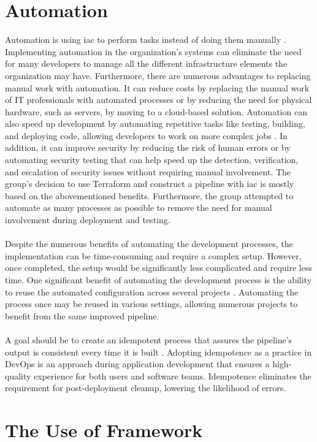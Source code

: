 \section{Automation}
Automation is using \gls{iac} to perform tasks instead of doing them manually \cite{automationredhat}. Implementing automation in the organization's systems can eliminate the need for many developers to manage all the different infrastructure elements the organization may have. Furthermore, there are numerous advantages to replacing manual work with automation. It can reduce costs by replacing the manual work of IT professionals with automated processes or by reducing the need for physical hardware, such as servers, by moving to a cloud-based solution. Automation can also speed up development by automating repetitive tasks like testing, building, and deploying code, allowing developers to work on more complex jobs \cite{automation}. In addition, it can improve security by reducing the risk of human errors or by automating security testing that can help speed up the detection, verification, and escalation of security issues without requiring manual involvement. The group's decision to use Terraform and construct a pipeline with \gls{iac} is mostly based on the abovementioned benefits. Furthermore, the group attempted to automate as many processes as possible to remove the need for manual involvement during deployment and testing. 
\\~\\
Despite the numerous benefits of automating the development processes, the implementation can be time-consuming and require a complex setup. However, once completed, the setup would be significantly less complicated and require less time. One significant benefit of automating the development process is the ability to reuse the automated configuration across several projects \cite{reusepipeline}. Automating the process once may be reused in various settings, allowing numerous projects to benefit from the same improved pipeline. 
\\~\\
A goal should be to create an \gls{idempotent} process that assures the pipeline's output is consistent every time it is built \cite{idempotent}. Adopting idempotence as a practice in DevOps is an approach during application development that ensures a high-quality experience for both users and software teams. Idempotence eliminates the requirement for post-deployment cleanup, lowering the likelihood of errors. 

\section{The Use of Framework}
